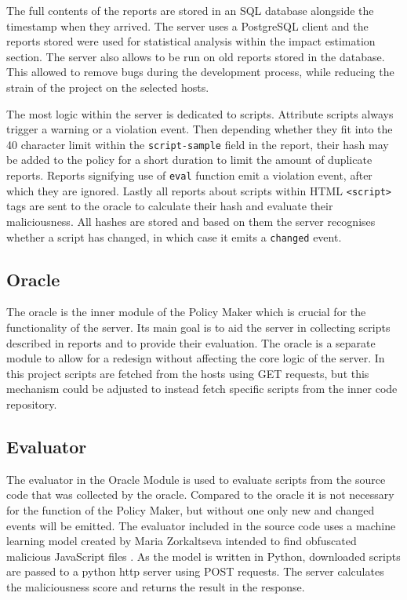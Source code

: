 The full contents of the reports are stored in an SQL database alongside the timestamp when they arrived.
The server uses a PostgreSQL client and the reports stored were used for statistical analysis within the impact estimation section.
The server also allows to be run on old reports stored in the database. 
This allowed to remove bugs during the development process, while reducing the strain of the project on the selected hosts.

The most logic within the server is dedicated to scripts.
Attribute scripts always trigger a warning or a violation event.
Then depending whether they fit into the 40 character limit within the \texttt{script-sample} field in the report, their hash may be added to the policy for a short duration to limit the amount of duplicate reports.
Reports signifying use of \texttt{eval} function emit a violation event, after which they are ignored.
Lastly all reports about scripts within HTML \texttt{<script>} tags are sent to the oracle to calculate their hash and evaluate their maliciousness.
All hashes are stored and based on them the server recognises whether a script has changed, in which case it emits a \texttt{changed} event.

\subsection{Oracle}
The oracle is the inner module of the Policy Maker which is crucial for the functionality of the server.
Its main goal is to aid the server in collecting scripts described in reports and to provide their evaluation.
The oracle is a separate module to allow for a redesign without affecting the core logic of the server.
In this project scripts are fetched from the hosts using GET requests, but this mechanism could be adjusted to instead fetch specific scripts from the inner code repository.

\subsection{Evaluator}
The evaluator in the Oracle Module is used to evaluate scripts from the source code that was collected by the oracle.
Compared to the oracle it is not necessary for the function of the Policy Maker, but without one only new and changed events will be emitted.
The evaluator included in the source code uses a machine learning model created by Maria Zorkaltseva intended to find obfuscated malicious JavaScript files \cite{evaluator}.
As the model is written in Python, downloaded scripts are passed to a python http server using POST requests.
The server calculates the maliciousness score and returns the result in the response.

